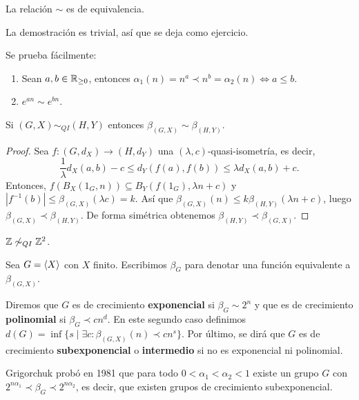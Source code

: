 \documentclass[twoside, 11pt]{article}
\begin{document}
\begin{lemma}
La relación $\sim$ es de equivalencia.
\end{lemma}
La demostración es trivial, así que se deja como ejercicio.

\begin{ejs}
Se prueba fácilmente:
\begin{enumerate}
\item Sean $a,b\in\mathbb{R}_{\geq 0}$, entonces $\alpha_1(n)=n^a\prec n^b=\alpha_2(n)\Leftrightarrow a\leq b$.
\item $e^{an}\sim e^{bn}$.
\end{enumerate}
\end{ejs}

\begin{lemma}
Si $(G,X)\sim_{QI} (H,Y)$ entonces $\beta_{(G,X)}\sim\beta_{(H,Y)}$.
\end{lemma}
\begin{proof}
Sea $f:(G,d_X)\to (H,d_Y)$ una $(\lambda,c)$-quasi-isometría, es decir,
\[
\frac{1}{\lambda}d_X(a,b)-c\leq d_Y(f(a),f(b))\leq \lambda d_X(a,b)+c.
\]
Entonces, $f(B_X(1_G,n))\subseteq B_Y(f(1_G),\lambda n+c)$ y $|f^{-1}(b)|\leq \beta_{(G,X)}(\lambda c)=k$. Así que $\beta_{(G,X)}(n)\leq k\beta_{(H,Y)}(\lambda n+c)$, luego $\beta_{(G,X)}\prec \beta_{(H,Y)}$. De forma simétrica obtenemos $\beta_{(H,Y)}\prec \beta_{(G,X)}$.
\end{proof}

\begin{coro}
$\mathbb{Z}\not\sim_{QI}\mathbb{Z}^2$.
\end{coro}

Sea $G=\langle{X}\rangle$ con $X$ finito. Escribimos $\beta_G$ para denotar una función equivalente a $\beta_{(G,X)}$.

\begin{defi}
Diremos que $G$ es de crecimiento \textbf{exponencial} si $\beta_G\sim 2^n$ y que es de crecimiento \textbf{polinomial} si $\beta_G\prec cn^d$. En este segundo caso definimos $d(G)=\inf\{s\mid \exists c:\beta_{(G,X)}(n)\prec cn^s\}$. Por último, se dirá que $G$ es de crecimiento \textbf{subexponencial} o \textbf{intermedio} si no es exponencial ni polinomial. 
\end{defi}
Grigorchuk probó en 1981 que para todo $0<\alpha_1<\alpha_2<1$ existe un grupo $G$ con $2^{n\alpha_1}\prec \beta_G\prec 2^{n\alpha_2}$, es decir, que existen grupos de crecimiento subexponencial. 
\end{document}
